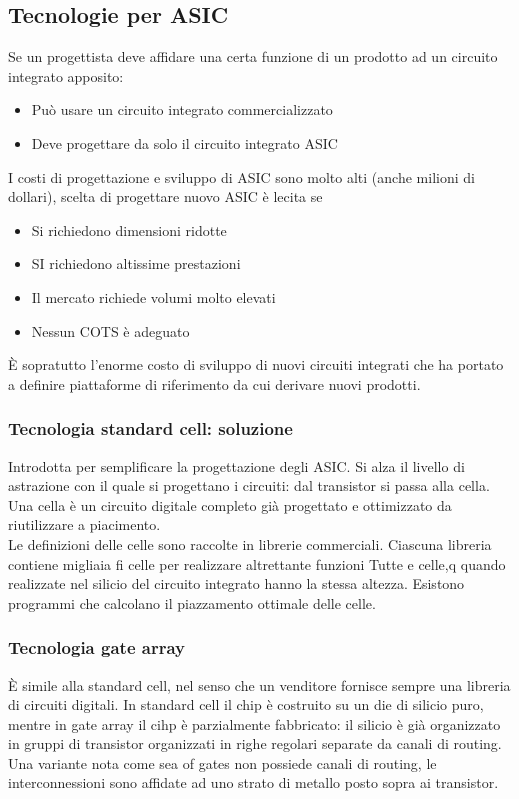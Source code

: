 \documentclass{article}
\begin{document}
\subsection{Tecnologie per ASIC}
Se un progettista deve affidare una certa funzione di un prodotto ad un circuito integrato apposito:
\begin{itemize}
\item Può usare un circuito integrato commercializzato
\item Deve progettare da solo il circuito integrato ASIC
\end{itemize}
I costi di progettazione e sviluppo di ASIC sono molto alti (anche milioni di dollari), scelta di progettare nuovo ASIC è lecita se
\begin{itemize}
\item Si richiedono dimensioni ridotte
\item SI richiedono altissime prestazioni
\item Il mercato richiede volumi molto elevati
\item Nessun COTS è adeguato
\end{itemize}
È sopratutto l'enorme costo di sviluppo di nuovi circuiti integrati che ha portato a definire piattaforme di riferimento da cui derivare nuovi prodotti.
\subsubsection{Tecnologia standard cell: soluzione}
Introdotta per semplificare la progettazione degli ASIC. Si alza il livello di astrazione con il quale si progettano i circuiti: dal transistor si passa alla cella. Una cella è un circuito digitale completo già progettato e ottimizzato da riutilizzare a piacimento.\\ Le definizioni delle celle sono raccolte in librerie commerciali. Ciascuna libreria contiene migliaia fi celle per realizzare altrettante funzioni Tutte e celle,q quando realizzate nel silicio del circuito integrato hanno la stessa altezza. Esistono programmi che calcolano il piazzamento ottimale delle celle.
\subsubsection{Tecnologia gate array}
È simile alla standard cell, nel senso che un venditore fornisce sempre una libreria di circuiti digitali. In standard cell il chip è costruito su un die di silicio puro, mentre in gate array il cihp è parzialmente fabbricato: il silicio è già organizzato in gruppi di transistor organizzati in righe regolari separate da canali di routing.\\ Una variante nota come sea of gates non possiede canali di routing, le interconnessioni sono affidate ad uno strato di metallo posto sopra ai transistor.
\end{document}
